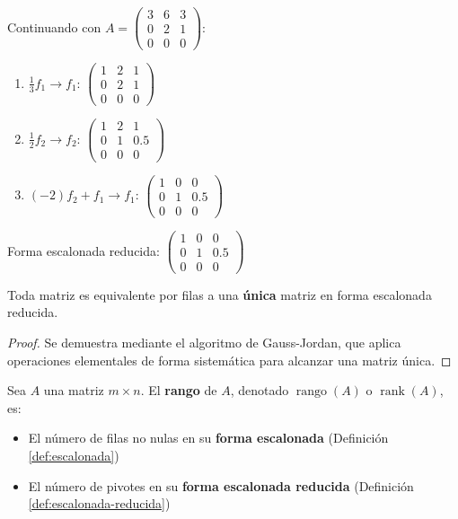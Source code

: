 \begin{example}
Continuando con $A = \begin{pmatrix} 3 & 6 & 3 \\ 0 & 2 & 1 \\ 0 & 0 & 0 \end{pmatrix}$:
\begin{myproof}
\begin{enumerate}
\item $\frac{1}{3}f_1 \to f_1$: $\begin{pmatrix} 1 & 2 & 1 \\ 0 & 2 & 1 \\ 0 & 0 & 0 \end{pmatrix}$
  
 \item $\frac{1}{2}f_2 \to f_2$: $\begin{pmatrix} 1 & 2 & 1 \\ 0 & 1 & 0.5 \\ 0 & 0 & 0 \end{pmatrix}$
  
\item $(-2)f_2 + f_1 \to f_1$: $\begin{pmatrix} \boxed{1} & 0 & 0 \\ 0 & \boxed{1} & 0.5 \\ 0 & 0 & 0 \end{pmatrix}$
\end{enumerate}
Forma escalonada reducida: $\begin{pmatrix} 1 & 0 & 0 \\ 0 & 1 & 0.5 \\ 0 & 0 & 0 \end{pmatrix}$
\end{myproof}
\end{example}

\begin{theorem}
Toda matriz es equivalente por filas a una \textbf{única} matriz en forma escalonada reducida.

\begin{proof}
Se demuestra mediante el algoritmo de Gauss-Jordan, que aplica operaciones elementales de forma sistemática para alcanzar una matriz única.
\end{proof}
\end{theorem}
\begin{definition}\label{def:rango}
Sea \( A \) una matriz \( m \times n \). El \textbf{rango} de \( A \), denotado \( \operatorname{rango}(A) \) o \( \operatorname{rank}(A) \), es:
\begin{itemize}
\item El número de filas no nulas en su \textbf{forma escalonada} (Definición \ref{def:escalonada})
\item El número de pivotes en su \textbf{forma escalonada reducida} (Definición \ref{def:escalonada-reducida})
\end{itemize}
\end{definition}

